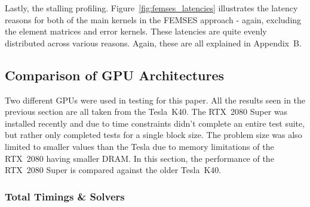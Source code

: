 Lastly, the stalling profiling. Figure~\ref{fig:femses_latencies} illustrates the latency reasons for both of the main kernels in the FEMSES approach - again, excluding the element matrices and error kernels. These latencies are quite evenly distributed across various reasons. Again, these are all explained in Appendix~B.

\subsection{Comparison of GPU Architectures}

Two different GPUs were used in testing for this paper. All the results seen in the previous section are all taken from the Tesla~K40. The RTX~2080 Super was installed recently and due to time constraints didn't complete an entire test suite, but rather only completed tests for a single block size. The problem size was also limited to smaller values than the Tesla due to memory limitations of the RTX~2080 having smaller DRAM. In this section, the performance of the RTX~2080 Super is compared against the older Tesla~K40.

\subsubsection{Total Timings \& Solvers}

